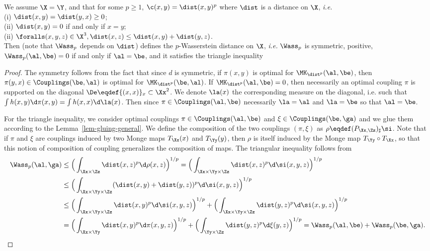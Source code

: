 \begin{prop}\label{prop-metric-measure}
We assume $\X=\Y$, and that for some $p \geq 1$, $\c(x,y)=\dist(x,y)^p$ where $\dist$ is a distance on $\X$, \emph{i.e.} \\
	\hbox{}\qquad (i) $\dist(x,y) = \dist(y,x) \geq 0$;  \\
	\hbox{}\qquad (ii)  $\dist(x,y)=0$ if and only if $x=y$;  \\
	\hbox{}\qquad (ii)  $\foralls (x,y,z) \in \X^3, \dist(x,z) \leq \dist(x,y)+\dist(y,z)$. \\
Then 
(note that $\Wass_p$ depends on $\dist$) defines the $p$-Wasserstein distance on $\X$, \emph{i.e.} $\Wass_p$ is symmetric, positive, $\Wass_p(\al,\be)=0$ if and only if $\al = \be$, and it satisfies the triangle inequality
\end{prop}

\begin{proof}
	The symmetry follows from the fact that since $d$ is symmetric, if $\pi(x,y)$ is optimal for $\MK_{\dist^p}(\al,\be)$, then 
	$\pi(y,x) \in \Couplings(\be,\al)$ is optimal for $\MK_{\dist^p}(\be,\al)$. 
	If $\MK_{\dist^p}(\al,\be)=0$, then necessarily an optimal coupling $\pi$ is supported on the diagonal $\De \eqdef \{(x,x)\}_x \subset \Xx^2$.
	We denote $\la(x)$ the corresponding measure on the diagonal, i.e. such that $\int h(x,y) \d\pi(x,y) = \int h(x,x) \d \la(x)$.
	Then since $\pi \in \Couplings(\al,\be)$ necessarily $\la=\al$ and $\la=\be$ so that $\al=\be$.
	
	For the triangle inequality, we consider optimal couplings $\pi \in \Couplings(\al,\be)$ and $\xi \in \Couplings(\be,\ga)$
	and we glue them according to the Lemma~\ref{lem-gluing-general}.
	We define the composition of the two couplings $(\pi,\xi)$ as $\rho \eqdef (P_{\Xx,\Zz})_\sharp \si$.
	Note that if $\pi$ and $\xi$ are couplings induced by two Monge maps $T_\Xx(x)$ and $T_\Yy(y)$, then $\rho$ is itself induced by the Monge map $T_\Yy \circ T_\Xx$, so that this notion of composition of coupling generalizes the composition of maps.
	The triangular inequality follows from  
	$$\begin{aligned}
		\Wass_p(\al,\ga) & \leq \Big( \int_{\Xx \times \Zz} \dist(x,z)^p \d\rho(x,z)\Big)^{1/p}  
		= \Big( \int_{\Xx \times \Yy \times \Zz} \dist(x,z)^p \d\si(x,y,z)\Big)^{1/p}		\\
		 &\leq \Big( \int_{\Xx \times \Yy \times \Zz} (\dist(x,y)+\dist(y,z))^p \d\si(x,y,z)\Big)^{1/p} \\
		 &\leq \Big( \int_{\Xx \times \Yy \times \Zz} \dist(x,y)^p \d\si(x,y,z)\Big)^{1/p}
		    +  \Big( \int_{\Xx \times \Yy \times \Zz} \dist(y,z)^p \d\si(x,y,z)\Big)^{1/p} \\
		  &= \Big( \int_{\Xx \times \Yy} \dist(x,y)^p \d\pi(x,y,z)\Big)^{1/p}
		    +  \Big( \int_{\Yy \times \Zz} \dist(y,z)^p \d\xi(y,z)\Big)^{1/p}
		    = \Wass_p(\al,\be)  + \Wass_p(\be,\ga) .
	\end{aligned}$$
\end{proof}

